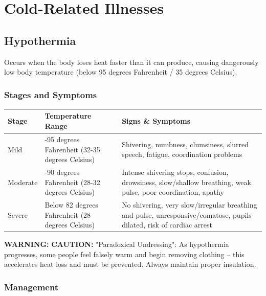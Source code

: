 \section{Cold-Related Illnesses}

\subsection{Hypothermia}

Occurs when the body loses heat faster than it can produce, causing dangerously low body temperature (below 95 degrees Fahrenheit / 35 degrees Celsius).

\subsubsection{Stages and Symptoms}

\begin{center}
\small
\begin{tabularx}{\textwidth}{@{}>{\raggedright\arraybackslash}l>{\raggedright\arraybackslash}X>{\raggedright\arraybackslash}X@{}}
\hline
\textbf{Stage} & \textbf{Temperature Range} & \textbf{Signs \& Symptoms} \\
\hline
Mild & 90-95 degrees Fahrenheit (32-35 degrees Celsius) & Shivering, numbness, clumsiness, slurred speech, fatigue, coordination problems \\
Moderate & 82-90 degrees Fahrenheit (28-32 degrees Celsius) & Intense shivering stops, confusion, drowsiness, slow/shallow breathing, weak pulse, poor coordination, apathy \\
Severe & Below 82 degrees Fahrenheit (28 degrees Celsius) & No shivering, very slow/irregular breathing and pulse, unresponsive/comatose, pupils dilated, risk of cardiac arrest \\
\hline
\end{tabularx}
\end{center}

\textbf{WARNING:} \textbf{CAUTION:} "Paradoxical Undressing": As hypothermia progresses, some people feel falsely warm and begin removing clothing -- this accelerates heat loss and must be prevented. Always maintain proper insulation.

\subsubsection{Management}

